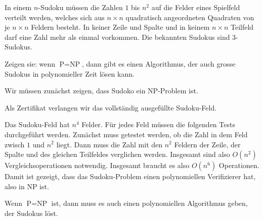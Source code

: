 In einem
$n$-Sudoku müssen die Zahlen $1$ bis $n^2$ auf die Felder eines
Spielfeld verteilt werden, welches sich aus $n\times n$ quadratisch
angeordneten Quadraten von je $n\times n$ Feldern besteht.
In keiner Zeile und Spalte und in keinem $n\times n$ Teilfeld
darf eine Zahl mehr als einmal vorkommen. Die bekannten Sudokus
sind 3-Sudokus.

Zeigen sie: wenn $\text{P}=\text{NP}$, dann gibt es einen Algorithmus,
der auch grosse Sudokus in polynomieller Zeit lösen kann.


\begin{loesung}
Wir müssen zunächst zeigen, dass Sudoko ein NP-Problem ist.

Als Zertifikat verlangen wir das vollständig ausgefüllte Sudoku-Feld.

Das Sudoku-Feld hat $n^4$ Felder. Für jedes Feld müssen die
folgenden Tests durchgeführt werden. Zunächst muss getestet
werden, ob die Zahl in dem Feld zwisch $1$ und $n^2$ liegt.
Dann muss die Zahl mit den $n^2$ Feldern der Zeile, der Spalte
und des gleichen Teilfeldes verglichen werden. Insgesamt sind
also $O(n^2)$ Vergleichsoperationen notwendig.
Insgesamt braucht es also $O(n^6)$ 
Operationen. Damit ist gezeigt, dass das Sudoku-Problem einen polynomiellen
Verifizierer hat, also in NP ist.

Wenn $\text{P}=\text{NP}$ ist, dann muss es auch einen polynomiellen
Algorithmus geben, der Sudokus löst.
\end{loesung}
